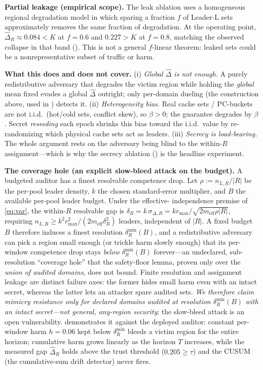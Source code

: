\documentclass{article}
\newcommand{\dhat}{\hat{\Delta}}
\begin{document}
\textbf{Partial leakage (empirical scope).} The leak ablation uses a homogeneous
regional degradation model in which sparing a fraction $f$ of Leader-L sets
approximately removes the same fraction of degradation. At the operating point,
$\dhat_R\approx0.084<K$ at $f{=}0.6$ and $0.227>K$ at $f{=}0.8$, matching the
observed collapse in that band (). This is not a general
$f$-linear theorem: leaked sets could be a nonrepresentative subset of traffic or
harm.

\textbf{What this does and does not cover.} (i) \emph{Global $\dhat$ is not
enough.} A purely redistributive adversary that degrades the victim region while
holding the \emph{global} mean fixed evades a global $\dhat$ outright; only
per-domain dueling (the construction above, used in ) detects
it. (ii) \emph{Heterogeneity bias.} Real cache sets / PC-buckets are not i.i.d.\
(hot/cold sets, conflict skew), so $\beta>0$; the guarantee degrades by $\beta$. Secret \emph{reseeding} each epoch shrinks this bias toward the i.i.d.\ value by
re-randomizing which physical cache sets act as leaders. (iii) \emph{Secrecy is
load-bearing.} The whole argument rests on the adversary being blind to the
within-$R$ assignment---which is why the secrecy ablation () is
the headline experiment.

\textbf{The coverage hole (an explicit slow-bleed attack on the budget).} A
budgeted auditor has a finest resolvable competence drop. Let
$\rho:=n_{L,R}/|R|$ be the per-pool leader density, $k$ the chosen standard-error
multiplier, and $B$ the available per-pool leader budget. Under the effective-
independence premise of \cref{eq:var}, the within-$R$ resolvable gap is
$\delta_R=k\,\sigma_{\Delta,R}
=k r_{\max}/\sqrt{2m_{\mathrm{eff}}\rho|R|}$, requiring
$n_{L,R}\ge k^2r_{\max}^2/(2m_{\mathrm{eff}}\delta_R^2)$ leaders, independent of
$|R|$. A fixed budget $B$ therefore induces a finest
resolution $\delta_R^{\min}(B)$, and a redistributive adversary can pick a region
small enough (or trickle harm slowly enough) that its per-window competence drop
stays \emph{below} $\delta_R^{\min}(B)$ forever---an undeclared, sub-resolution
``coverage hole'' that the safety-floor lemma, proven only over the \emph{union of
audited domains}, does not bound. Finite resolution and assignment leakage are
distinct failure axes: the former hides small harm even with an intact secret,
whereas the latter lets an attacker spare audited sets. \emph{We therefore claim
mimicry resistance only for declared domains audited at resolution
$\delta_R^{\min}(B)$ with an intact secret---not general, any-region security}; the
slow-bleed attack is an open vulnerability. \Cref{fig:hole} demonstrates it
against the deployed auditor: constant per-window harm $h{=}0.06$ kept below
$\delta_R^{\min}$ bleeds a victim region for the entire horizon; cumulative harm
grows linearly as the horizon $T$ increases,
while the measured gap $\hat\Delta_R$ holds above the trust threshold ($0.205\!\ge\!\tau$) and the CUSUM (the cumulative-sum drift detector) never fires.
\end{document}
